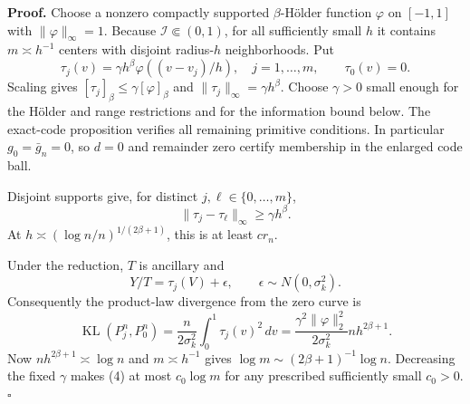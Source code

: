 \textbf{Proof.}
Choose a nonzero compactly supported \(\beta\)-Hölder function
\(\varphi\) on \([-1,1]\) with \(\|\varphi\|_\infty=1\).
Because \(\mathcal I\Subset(0,1)\), for all sufficiently small \(h\) it contains \(m\asymp h^{-1}\) centers with disjoint radius-\(h\) neighborhoods.  Put
\[
 \tau_j(v)=\gamma h^\beta\varphi((v-v_j)/h),
 \quad j=1,\ldots,m,\qquad \tau_0(v)=0. \tag{1}
\]
Scaling gives
\([\tau_j]_\beta\le\gamma[\varphi]_\beta\) and
\(\|\tau_j\|_\infty=\gamma h^\beta\).  Choose \(\gamma>0\) small enough for the Hölder and range restrictions and for the information bound below.  The exact-code proposition verifies all remaining primitive conditions.  In particular \(g_0=\bar g_n=0\), so \(d=0\) and remainder zero certify membership in the enlarged code ball.

Disjoint supports give, for distinct \(j,\ell\in\{0,\ldots,m\}\),
\[
 \|\tau_j-\tau_\ell\|_\infty\ge\gamma h^\beta. \tag{2}
\]
At \(h\asymp(\log n/n)^{1/(2\beta+1)}\), this is at least \(cr_n\).

Under the reduction, \(T\) is ancillary and
\[
 Y/T=\tau_j(V)+\epsilon,\qquad
 \epsilon\sim N(0,\sigma_k^2). \tag{3}
\]
Consequently the product-law divergence from the zero curve is
\[
 \operatorname{KL}(P_j^n,P_0^n)
 =\frac{n}{2\sigma_k^2}\int_0^1\tau_j(v)^2\,dv
 =\frac{\gamma^2\|\varphi\|_2^2}{2\sigma_k^2}
 nh^{2\beta+1}. \tag{4}
\]
Now \(nh^{2\beta+1}\asymp\log n\) and
\(m\asymp h^{-1}\) gives \(\log m\sim(2\beta+1)^{-1}\log n\).
Decreasing the fixed \(\gamma\) makes (4) at most \(c_0\log m\) for any prescribed sufficiently small \(c_0>0\). \(\square\)